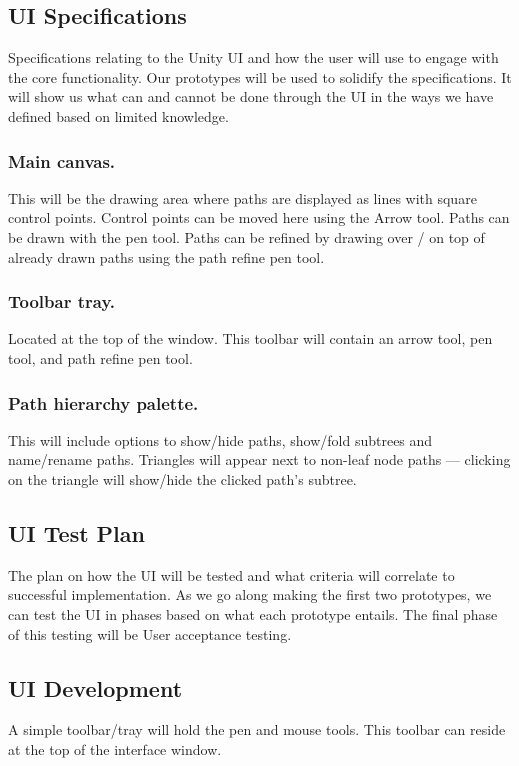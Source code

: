 \subsection{UI Specifications}
Specifications relating to the Unity UI and how the user will use to engage with the core functionality. Our prototypes will be used to solidify the specifications. It will show us what can and cannot be done through the UI in the ways we have defined based on limited knowledge.

\subsubsection{Main canvas.} This will be the drawing area where paths are displayed as lines with square control points. Control points can be moved here using the Arrow tool. Paths can be drawn with the pen tool. Paths can be refined by drawing over / on top of already drawn paths using the path refine pen tool.

\subsubsection{Toolbar tray.} Located at the top of the window. This toolbar will contain an arrow tool, pen tool, and path refine pen tool.

\subsubsection{Path hierarchy palette.} This will include options to show/hide paths, show/fold subtrees and name/rename paths. Triangles will appear next to non-leaf node paths --- clicking on the triangle will show/hide the clicked path’s subtree.

\subsection{UI Test Plan}
The plan on how the UI will be tested and what criteria will correlate to successful implementation. As we go along making the first two prototypes, we can test the UI in phases based on what each prototype entails. The final phase of this testing will be User acceptance testing.

\subsection{UI Development}
A simple toolbar/tray will hold the pen and mouse tools. This toolbar can reside at the top of the interface window.

